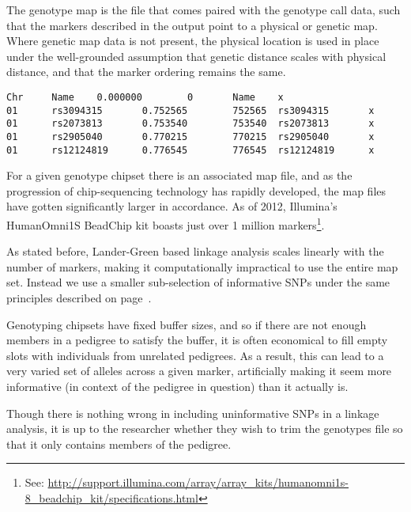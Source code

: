 The genotype map is the file that comes paired with the genotype call data, such that the markers described in the output point to a physical or genetic map. Where genetic map data is not present, the physical location is used in place under the well-grounded assumption that genetic distance scales with physical distance, and that the marker ordering remains the same.

\begingroup
\vspace{10pt}
\begin{lstlisting}
Chr     Name    0.000000        0       Name    x
01      rs3094315       0.752565        752565  rs3094315       x
01      rs2073813       0.753540        753540  rs2073813       x
01      rs2905040       0.770215        770215  rs2905040       x
01      rs12124819      0.776545        776545  rs12124819      x
\end{lstlisting}
\vspace{-10pt}
\endgroup

For a given genotype chipset there is an associated map file, and as the progression of chip-sequencing technology has rapidly developed, the map files have gotten significantly larger in accordance. As of 2012, Illumina's HumanOmni1S BeadChip kit boasts just over 1 million markers\footnote{See: \tiny\url{http://support.illumina.com/array/array_kits/humanomni1s-8_beadchip_kit/specifications.html}}.

As stated before, Lander-Green based linkage analysis scales linearly with the number of markers, making it computationally impractical to use the entire map set. Instead we use a smaller sub-selection of informative SNPs under the same principles described on page~\pageref{informativemarkers}.

Genotyping chipsets have fixed buffer sizes, and so if there are not enough members in a pedigree to satisfy the buffer, it is often economical to fill empty slots with individuals from unrelated pedigrees. As a result, this can lead to a very varied set of alleles across a given marker, artificially making it seem more informative (in context of the pedigree in question) than it actually is. 

Though there is nothing wrong in including uninformative SNPs in a linkage analysis, it is up to the researcher whether they wish to trim the genotypes file so that it only contains members of the pedigree.

